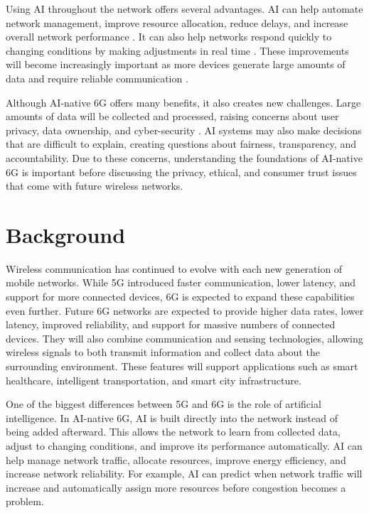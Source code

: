 \documentclass[letterpaper]{article}
\begin{document}
Using AI throughout the network offers several advantages. AI can help automate network management, improve resource allocation, reduce delays, and increase overall network performance \cite{porambage2021}. It can also help networks respond quickly to changing conditions by making adjustments in real time \cite{taghia2024}. These improvements will become increasingly important as more devices generate large amounts of data and require reliable communication \cite{ju2024}.

Although AI-native 6G offers many benefits, it also creates new challenges. Large amounts of data will be collected and processed, raising concerns about user privacy, data ownership, and cyber-security \cite{chabira2025}. AI systems may also make decisions that are difficult to explain, creating questions about fairness, transparency, and accountability. Due to these concerns, understanding the foundations of AI-native 6G is important before discussing the privacy, ethical, and consumer trust issues that come with future wireless networks.

\section{Background}
Wireless communication has continued to evolve with each new generation of mobile networks. While 5G introduced faster communication, lower latency, and support for more connected devices, 6G is expected to expand these capabilities even further. Future 6G networks are expected to provide higher data rates, lower latency, improved reliability, and support for massive numbers of connected devices. They will also combine communication and sensing technologies, allowing wireless signals to both transmit information and collect data about the surrounding environment. These features will support applications such as smart healthcare, intelligent transportation, and smart city infrastructure.

One of the biggest differences between 5G and 6G is the role of artificial intelligence. In AI-native 6G, AI is built directly into the network instead of being added afterward. This allows the network to learn from collected data, adjust to changing conditions, and improve its performance automatically. AI can help manage network traffic, allocate resources, improve energy efficiency, and increase network reliability. For example, AI can predict when network traffic will increase and automatically assign more resources before congestion becomes a problem.
\end{document}
